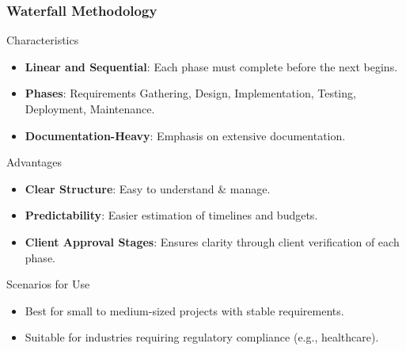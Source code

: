 \documentclass{beamer}
\begin{document}
\begin{frame}[fragile]
    \frametitle{Waterfall Methodology}
    \begin{block}{Characteristics}
        \begin{itemize}
            \item \textbf{Linear and Sequential}: Each phase must complete before the next begins.
            \item \textbf{Phases}: Requirements Gathering, Design, Implementation, Testing, Deployment, Maintenance.
            \item \textbf{Documentation-Heavy}: Emphasis on extensive documentation.
        \end{itemize}
    \end{block}
    
    \begin{block}{Advantages}
        \begin{itemize}
            \item \textbf{Clear Structure}: Easy to understand & manage.
            \item \textbf{Predictability}: Easier estimation of timelines and budgets.
            \item \textbf{Client Approval Stages}: Ensures clarity through client verification of each phase.
        \end{itemize}
    \end{block}
    
    \begin{block}{Scenarios for Use}
        \begin{itemize}
            \item Best for small to medium-sized projects with stable requirements.
            \item Suitable for industries requiring regulatory compliance (e.g., healthcare).
        \end{itemize}
    \end{block}
\end{frame}
\end{document}
